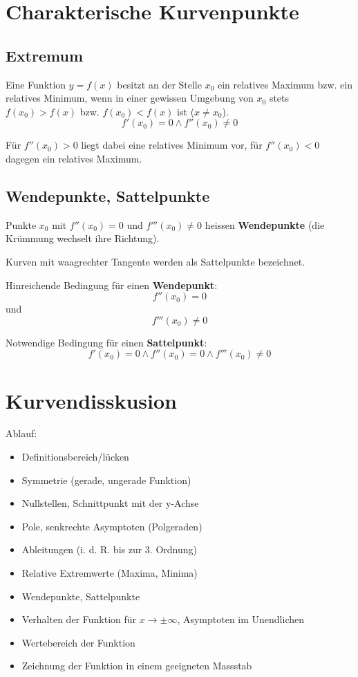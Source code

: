 \documentclass[a4paper,DIV10,12pt,headsepline,smallheadings,halfparskip-]{scrreprt}
\begin{document}
	\section{Charakterische Kurvenpunkte} %
	\label{sec:charakterische_kurvenpunkte}
	\subsection{Extremum} %
	\label{sub:extremum}
	Eine Funktion \(y = f(x) \) besitzt an der Stelle \(x_0\) ein relatives Maximum bzw. ein relatives Minimum, wenn in einer gewissen Umgebung von \(x_0\) stets \newline
	\(f(x_0) > f(x) \) bzw. \( f(x_0) < f(x) \) \newline
	ist (\(x \neq x_0\)).
		\[f'(x_0) = 0 \wedge f''(x_0) \neq 0 \]

	Für \(f''(x_0) > 0 \) liegt dabei eine relatives Minimum vor, für \(f''(x_0) < 0 \) dagegen ein relatives Maximum.
	\subsection{Wendepunkte, Sattelpunkte} %
	Punkte \(x_0\) mit \(f''(x_0) = 0 \) und \(f'''(x_0) \neq 0 \) heissen \textbf{Wendepunkte} (die Krümmung wechselt ihre Richtung).
	\par Kurven mit waagrechter Tangente werden als Sattelpunkte bezeichnet.
	\par Hinreichende Bedingung für einen \textbf{Wendepunkt}: \newline
	\[f''(x_0) = 0 \] und \[ f'''(x_0) \neq 0 \]
	\par Notwendige Bedingung für einen \textbf{Sattelpunkt}: \newline
	\[f'(x_0) = 0 \wedge f''(x_0) = 0 \wedge f'''(x_0) \neq 0 \]

	\section{Kurvendisskusion}
	Ablauf:\newline
	\begin{itemize}
		\item Definitionsbereich/lücken
		\item Symmetrie (gerade, ungerade Funktion)
		\item Nullstellen, Schnittpunkt mit der y-Achse
		\item Pole, senkrechte Asymptoten (Polgeraden)
		\item Ableitungen (i. d. R. bis zur 3. Ordnung)
		\item Relative Extremwerte (Maxima, Minima)
		\item Wendepunkte, Sattelpunkte
		\item Verhalten der Funktion für \(x \rightarrow \pm \infty \), Asymptoten im Unendlichen
		\item Wertebereich der Funktion
		\item Zeichnung der Funktion in einem geeigneten Massstab
	\end{itemize}
	
\end{document}
